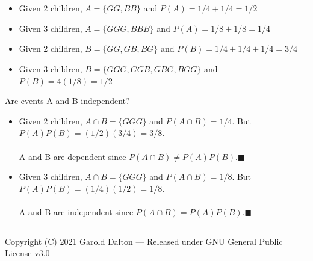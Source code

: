 \documentclass[14pt]{extarticle}
\begin{document}
\\\\
\begin{itemize}
	\item Given 2 children, $A=\{GG, BB\}$ and $P(A)=1/4 + 1/4 = 1/2$
	\item Given 3 children, $A=\{GGG, BBB\}$ and $P(A)=1/8 + 1/8 = 1/4$
	\item Given 2 children, $B=\{GG, GB, BG\}$ and $P(B)=1/4 + 1/4 + 1/4= 3/4$
	\item Given 3 children, $B=\{GGG,GGB,GBG,BGG\}$ and $P(B)=4(1/8) = 1/2$
\end{itemize}
Are events A and B independent?
\begin{itemize}
	\item Given 2 children, $A\cap B = \{GGG\}$ and $P(A\cap B)= 1/4$. But $P(A)P(B)= (1/2)(3/4)=3/8$.
	\\\\
	A and B are dependent since $P(A\cap B) \neq P(A)P(B)$.$\blacksquare$
	\item Given 3 children, $A\cap B = \{GGG\}$ and $P(A\cap B)= 1/8$. But $P(A)P(B)= (1/4)(1/2)=1/8$.
	\\\\
	A and B are independent since $P(A\cap B) = P(A)P(B)$.$\blacksquare$
\end{itemize}


\noindent\rule{\textwidth}{1pt}
{\footnotesize Copyright (C) 2021 Garold Dalton --- Released under GNU General Public License v3.0}


\cleardoublepage
\end{document}
